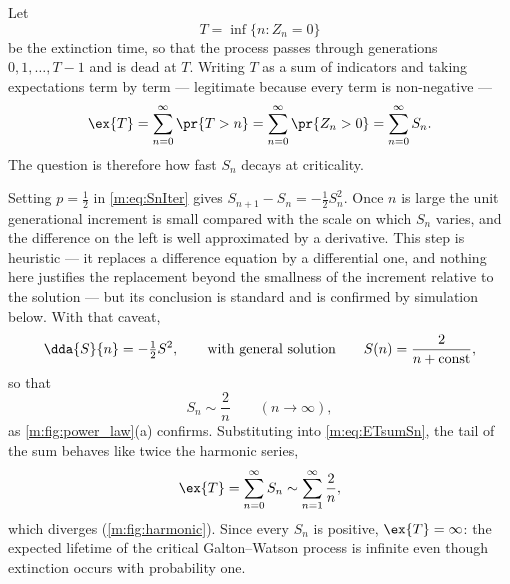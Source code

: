 Let
\begin{equation*}
T = \inf\{n : Z_n = 0\}
\end{equation*}
be the extinction time, so that the process passes through generations
$0,1,\dots,T-1$ and is dead at $T$. Writing $T$ as a sum of indicators and taking
expectations term by term --- legitimate because every term is non-negative ---
\begin{equation}
\label{m:eq:ETsumSn}
\ex{T} = \sum_{n=0}^{\infty}\pr{T>n} = \sum_{n=0}^{\infty}\pr{Z_n>0}
= \sum_{n=0}^{\infty}S_n .
\end{equation}
The question is therefore how fast $S_n$ decays at criticality.

Setting $p=\tfrac12$ in \cref{m:eq:SnIter} gives $S_{n+1}-S_n = -\tfrac12 S_n^2$.
Once $n$ is large the unit generational increment is small compared with the scale
on which $S_n$ varies, and the difference on the left is well approximated by a
derivative. This step is heuristic --- it replaces a difference equation by a
differential one, and nothing here justifies the replacement beyond the smallness
of the increment relative to the solution --- but its conclusion is standard and is
confirmed by simulation below. With that caveat,
\begin{equation*}
\dda{S}{n} = -\tfrac12 S^2,
\qquad\text{with general solution}\qquad
S(n) = \frac{2}{n+\text{const}},
\end{equation*}
so that
\begin{equation}
\label{m:eq:twoovern}
S_n \sim \frac{2}{n}\qquad(n\to\infty),
\end{equation}
as \cref{m:fig:power_law}(a) confirms. Substituting into \cref{m:eq:ETsumSn}, the tail
of the sum behaves like twice the harmonic series,
\begin{equation*}
\ex{T} = \sum_{n=0}^{\infty}S_n \sim \sum_{n=1}^{\infty}\frac{2}{n},
\end{equation*}
which diverges (\cref{m:fig:harmonic}). Since every $S_n$ is positive,
$\ex{T}=\infty$: the expected lifetime of the critical Galton--Watson process is
infinite even though extinction occurs with probability one.

